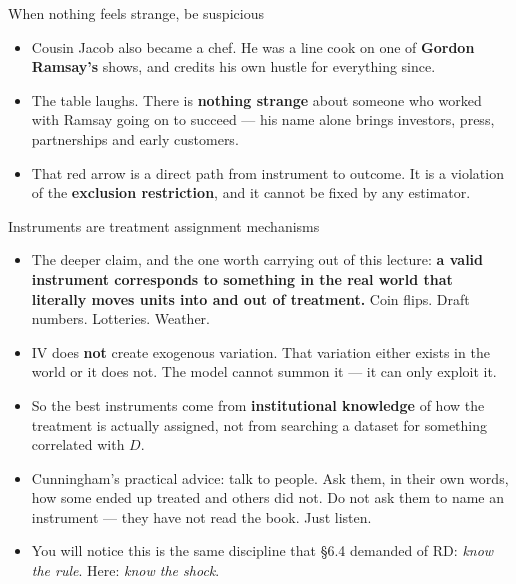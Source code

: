 \documentclass[
  11pt,
  ignorenonframetext,
  aspectratio=169,
]{beamer}
\providecommand{\tightlist}{%
  \setlength{\itemsep}{0pt}\setlength{\parskip}{0pt}}
\begin{document}
\begin{frame}{When nothing feels strange, be suspicious}
\protect{}\label{when-nothing-feels-strange-be-suspicious}
\begin{center}
\end{center}

\begin{itemize}
\tightlist
\item
  Cousin Jacob also became a chef. He was a line cook on one of
  \textbf{Gordon Ramsay's} shows, and credits his own hustle for
  everything since.
\item
  The table laughs. There is \textbf{nothing strange} about someone who
  worked with Ramsay going on to succeed --- his name alone brings
  investors, press, partnerships and early customers.
\item
  That red arrow is a direct path from instrument to outcome. It is a
  violation of the \textbf{exclusion restriction}, and it cannot be
  fixed by any estimator.
\end{itemize}
\end{frame}

\begin{frame}{Instruments are treatment assignment mechanisms}
\protect{}\label{instruments-are-treatment-assignment-mechanisms}
\begin{itemize}
\tightlist
\item
  The deeper claim, and the one worth carrying out of this lecture:
  \textbf{a valid instrument corresponds to something in the real world
  that literally moves units into and out of treatment.} Coin flips.
  Draft numbers. Lotteries. Weather.
\item
  IV does \textbf{not} create exogenous variation. That variation either
  exists in the world or it does not. The model cannot summon it --- it
  can only exploit it.
\item
  So the best instruments come from \textbf{institutional knowledge} of
  how the treatment is actually assigned, not from searching a dataset
  for something correlated with \(D\).
\item
  Cunningham's practical advice: talk to people. Ask them, in their own
  words, how some ended up treated and others did not. Do not ask them
  to name an instrument --- they have not read the book. Just listen.
\item
  You will notice this is the same discipline that §6.4 demanded of RD:
  \emph{know the rule}. Here: \emph{know the shock}.
\end{itemize}
\end{frame}
\end{document}
